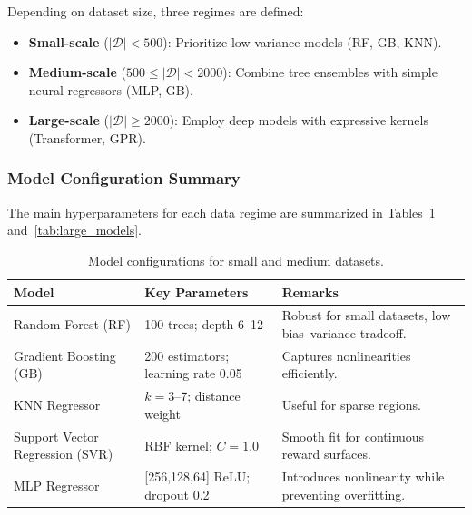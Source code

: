 \documentclass[conference]{IEEEtran}
\begin{document}
Depending on dataset size, three regimes are defined:
\begin{itemize}
    \item \textbf{Small-scale} ($|\mathcal{D}| < 500$): Prioritize low-variance models (RF, GB, KNN).
    \item \textbf{Medium-scale} ($500 \le |\mathcal{D}| < 2000$): Combine tree ensembles with simple neural regressors (MLP, GB).
    \item \textbf{Large-scale} ($|\mathcal{D}| \ge 2000$): Employ deep models with expressive kernels (Transformer, GPR).
\end{itemize}

\subsubsection{Model Configuration Summary}

The main hyperparameters for each data regime are summarized in Tables~\ref{tab:small_models} and~\ref{tab:large_models}.



\begin{table}[!t]
\centering
\caption{Model configurations for small and medium datasets.}
\label{tab:small_models}
\small %
\setlength{\tabcolsep}{3pt} %
\begin{tabularx}{\columnwidth}{@{} p{2.3cm} p{2.8cm} >{\RaggedRight}X @{}}
\toprule
\textbf{Model} & \textbf{Key Parameters} & \textbf{Remarks} \\
\midrule
Random Forest (RF) & 100 trees; depth 6–12 & Robust for small datasets, low bias–variance tradeoff. \\
Gradient Boosting (GB) & 200 estimators; learning rate 0.05 & Captures nonlinearities efficiently. \\
KNN Regressor & $k=3$–7; distance weight & Useful for sparse regions. \\
Support Vector Regression (SVR) & RBF kernel; $C=1.0$ & Smooth fit for continuous reward surfaces. \\
MLP Regressor & [256,128,64] ReLU; dropout 0.2 & Introduces nonlinearity while preventing overfitting. \\ 
\bottomrule
\end{tabularx}
\end{table}


\end{document}
